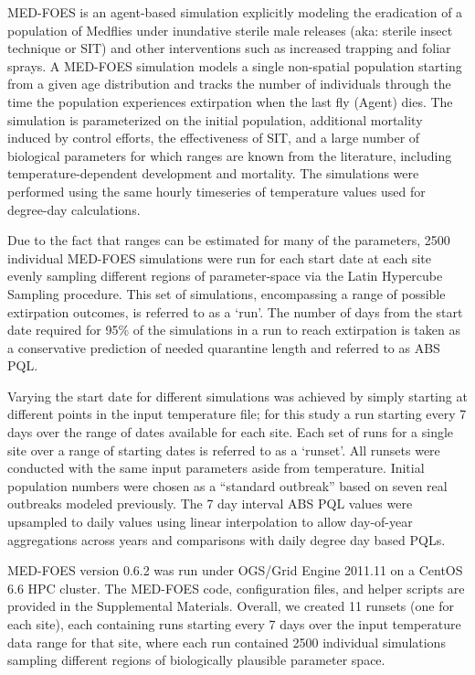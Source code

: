 \documentclass[10pt,a4paper,twocolumn]{article}
\begin{document}
MED-FOES\cite{manoukis_computer_2014,manoukis_agent-based_2014} is 
an agent-based simulation explicitly modeling the eradication of a population of Medflies 
under inundative sterile male releases (aka: sterile insect technique or SIT) and other interventions
such as increased trapping and foliar sprays.
A MED-FOES simulation models a single non-spatial population starting from a given age distribution 
and tracks the number of individuals through the time the population experiences extirpation when the last 
fly (Agent) dies.
The simulation is parameterized on the initial population, additional mortality induced by control efforts,
the effectiveness of SIT, and a large number of biological parameters for which ranges are known from 
the literature, including temperature-dependent development and mortality.
The simulations were performed using the same hourly timeseries of temperature values 
used for degree-day calculations.

Due to the fact that ranges can be estimated for many of the parameters,
2500 individual MED-FOES simulations were run for each start date at each site 
evenly sampling different regions of parameter-space via the 
Latin Hypercube Sampling\cite{10.2307/1403510} procedure.
This set of simulations, encompassing a range of possible extirpation outcomes, is referred to as a `run'.
The number of days from the start date required for
95\% of the simulations in a run to reach extirpation is 
taken as a conservative prediction of needed quarantine length and referred to as ABS PQL.

Varying the start date for different simulations was achieved by simply 
starting at different points in the input temperature file; 
for this study a run starting every 7 days over the range of dates available for each site.
Each set of runs for a single site over a range of starting dates is referred to as a `runset'.
All runsets were conducted with the same input parameters aside from temperature.
Initial population numbers were chosen as a ``standard outbreak'' based on seven real 
outbreaks modeled previously\cite{manoukis_agent-based_2014}.
The 7 day interval ABS PQL values were upsampled to daily values using linear interpolation
to allow day-of-year aggregations across years and comparisons with daily degree day based PQLs.

MED-FOES version 0.6.2 was run under OGS/Grid Engine 2011.11 on a CentOS 6.6 HPC cluster.
The MED-FOES code, configuration files, and helper scripts are provided in the Supplemental Materials.
Overall, we created 11 runsets (one for each site), 
each containing runs starting every 7 days over the input temperature data range for that site,
where each run contained 2500 individual simulations sampling different regions of 
biologically plausible parameter space.
\end{document}
